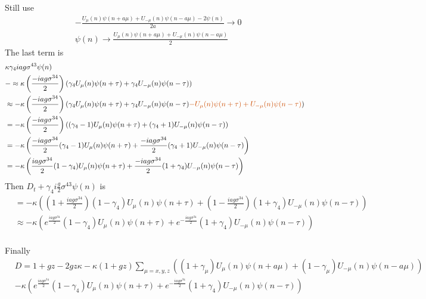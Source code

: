 Still use
\begin{equation}
\begin{split}
& -\frac{U_{\mu}(n)\psi(n+a\mu)+U_{-\mu}(n)\psi(n-a\mu)-2\psi (n)}{2a} \to 0 \\
& \psi (n) \to \frac{U_{\mu}(n)\psi(n+a\mu)+U_{-\mu}(n)\psi(n-a\mu)}{2}
\end{split}
\end{equation}
The last term is
\begin{equation}
\begin{split}
&\kappa \gamma _4 ia g \sigma ^{43} \psi (n)\\
&-\approx \kappa \left( \frac{ -iag \sigma ^{34}}{2}\right) ( \gamma _4 U_{\mu}(n) \psi (n+\tau) + \gamma _4 U_{-\mu}(n) \psi (n-\tau)) \\
&\approx -\kappa \left( \frac{ -iag \sigma ^{34}}{2}\right)  ( \gamma _4 U_{\mu}(n) \psi (n+\tau) + \gamma _4 U_{-\mu}(n) \psi (n-\tau) \textcolor[rgb]{0.8,0.3,0}{- U_{\mu}(n)\psi (n+\tau) + U_{-\mu}(n)\psi (n-\tau)}) \\
&=-\kappa\left( \frac{ -iag \sigma ^{34}}{2}\right) \left((\gamma _4-1)U_{\mu}(n)\psi (n+\tau) +(\gamma _4+1) U_{-\mu}(n) \psi (n-\tau)\right)\\
&= -\kappa \left(\frac{-iag \sigma ^{34}}{2} (\gamma _4-1)U_{\mu}(n)\psi (n+\tau) + \frac{-iag \sigma ^{34}}{2} (\gamma _4+1) U_{-\mu}(n) \psi (n-\tau)\right)\\
&= -\kappa \left(\frac{iag \sigma ^{34}}{2} (1-\gamma _4)U_{\mu}(n)\psi (n+\tau) + \frac{-iag \sigma ^{34}}{2} (1+\gamma _4) U_{-\mu}(n) \psi (n-\tau)\right)\\
\end{split}
\end{equation}
Then $D_t +  \gamma _4 i \frac{g}{2} \sigma ^{43} \psi (n)$ is
\begin{equation}
\begin{split}
&= -\kappa \left(\left(1+\frac{iag \sigma ^{34}}{2}\right) (1-\gamma _4)U_{\mu}(n)\psi (n+\tau) + \left(1-\frac{iag \sigma ^{34}}{2}\right) (1+\gamma _4) U_{-\mu}(n) \psi (n-\tau)\right)\\
&\approx -\kappa \left(e^{\frac{iag \sigma ^{34}}{2}} (1-\gamma _4)U_{\mu}(n)\psi (n+\tau) + e^{-\frac{iag \sigma ^{34}}{2}} (1+\gamma _4) U_{-\mu}(n) \psi (n-\tau)\right)\\
\end{split}
\end{equation}

Finally
\begin{equation}
\begin{split}
&D=1+gz- 2gz\kappa - \kappa(1+g z)\sum _{\mu = x,y,z}\left((1+\gamma _{\mu})U_{\mu}(n)\psi(n+a\mu)+(1-\gamma _{\mu})U_{-\mu}(n)\psi(n-a\mu)\right)\\
&-\kappa \left(e^{\frac{iag \sigma ^{34}}{2}} (1-\gamma _4)U_{\mu}(n)\psi (n+\tau) + e^{-\frac{iag \sigma ^{34}}{2}} (1+\gamma _4) U_{-\mu}(n) \psi (n-\tau)\right)\\
\end{split}
\end{equation}

